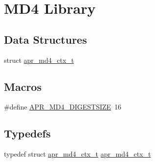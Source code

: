 \hypertarget{group___a_p_r___util___m_d4}{\section{M\-D4 Library}
\label{group___a_p_r___util___m_d4}
}
\subsection*{Data Structures}
\begin{DoxyCompactItemize}
\item 
struct \hyperlink{structapr__md4__ctx__t}{apr\-\_\-md4\-\_\-ctx\-\_\-t}
\end{DoxyCompactItemize}
\subsection*{Macros}
\begin{DoxyCompactItemize}
\item 
\#define \hyperlink{group___a_p_r___util___m_d4_ga84489272090a11902d831c288c81c20f}{A\-P\-R\-\_\-\-M\-D4\-\_\-\-D\-I\-G\-E\-S\-T\-S\-I\-Z\-E}~16
\end{DoxyCompactItemize}
\subsection*{Typedefs}
\begin{DoxyCompactItemize}
\item 
typedef struct \hyperlink{structapr__md4__ctx__t}{apr\-\_\-md4\-\_\-ctx\-\_\-t} \hyperlink{group___a_p_r___util___m_d4_ga273e0d8ad064dba908e46bde074af0d8}{apr\-\_\-md4\-\_\-ctx\-\_\-t}
\end{DoxyCompactItemize}
